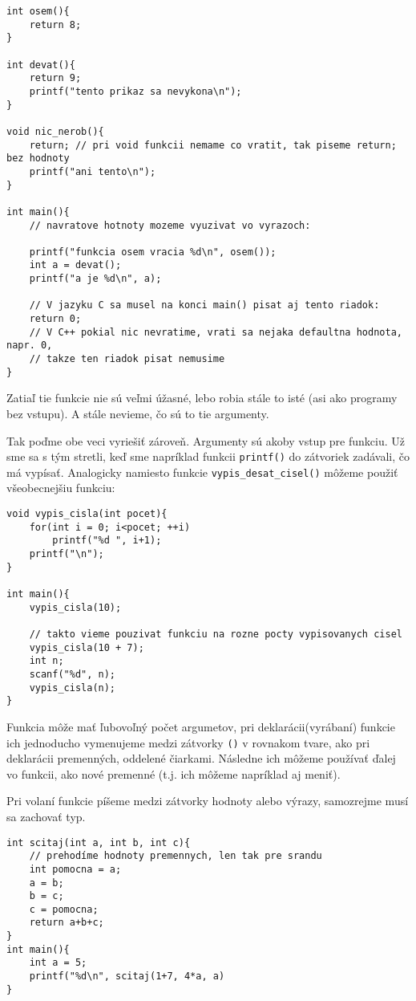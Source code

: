 \begin{lstlisting}
int osem(){
    return 8;
}

int devat(){
    return 9;
    printf("tento prikaz sa nevykona\n");
}

void nic_nerob(){
    return; // pri void funkcii nemame co vratit, tak piseme return; bez hodnoty
    printf("ani tento\n");
}

int main(){
    // navratove hotnoty mozeme vyuzivat vo vyrazoch:

    printf("funkcia osem vracia %d\n", osem());
    int a = devat();
    printf("a je %d\n", a);

    // V jazyku C sa musel na konci main() pisat aj tento riadok:
    return 0;
    // V C++ pokial nic nevratime, vrati sa nejaka defaultna hodnota, napr. 0,
    // takze ten riadok pisat nemusime
}   
\end{lstlisting}

\medskip
    
Zatiaľ tie funkcie nie sú veľmi úžasné, lebo robia stále to isté (asi ako
programy bez vstupu).  A stále nevieme, čo sú to tie argumenty.

Tak poďme obe veci vyriešiť zároveň. Argumenty sú akoby vstup pre funkciu.  Už
sme sa s tým stretli, keď sme napríklad funkcii \verb!printf()! do zátvoriek
zadávali, čo má vypísať.  Analogicky namiesto funkcie
\verb!vypis_desat_cisel()! môžeme použiť všeobecnejšiu funkciu:

\begin{lstlisting}
void vypis_cisla(int pocet){
    for(int i = 0; i<pocet; ++i)
        printf("%d ", i+1);
    printf("\n"); 
}

int main(){
    vypis_cisla(10);

    // takto vieme pouzivat funkciu na rozne pocty vypisovanych cisel
    vypis_cisla(10 + 7);
    int n;
    scanf("%d", n);
    vypis_cisla(n);
}
\end{lstlisting}

Funkcia môže mať ľubovoľný počet argumetov, pri deklarácii(vyrábaní) funkcie
ich jednoducho vymenujeme medzi zátvorky \verb!()! v rovnakom tvare, ako pri
deklarácii premenných, oddelené čiarkami. Následne ich môžeme používať ďalej vo
funkcii, ako nové premenné (t.j. ich môžeme napríklad aj meniť).

Pri volaní funkcie píšeme medzi zátvorky hodnoty alebo výrazy, samozrejme musí
sa zachovať typ.

\begin{lstlisting}
int scitaj(int a, int b, int c){
    // prehodíme hodnoty premennych, len tak pre srandu
    int pomocna = a;
    a = b;
    b = c;
    c = pomocna;
    return a+b+c;
}
int main(){
    int a = 5;
    printf("%d\n", scitaj(1+7, 4*a, a)
}
\end{lstlisting}

